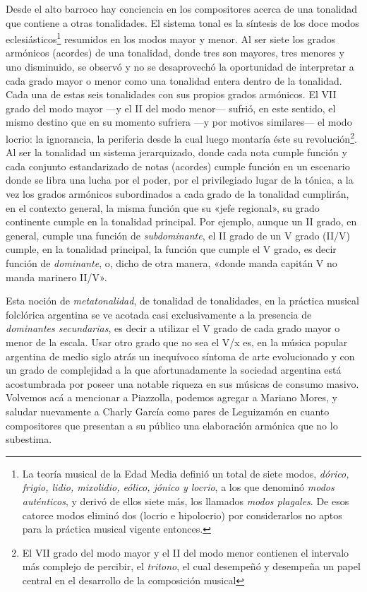 Desde el alto barroco hay conciencia en los compositores acerca de una tonalidad que contiene a otras tonalidades. El sistema tonal es la síntesis de los doce modos eclesiásticos\footnote{La teoría musical de la Edad Media definió un total de siete modos, \emph{dórico, frigio, lidio, mixolidio, eólico, jónico y locrio}, a los que denominó \emph{modos auténticos}, y derivó de ellos siete más, los llamados \emph{modos plagales}. De esos catorce modos eliminó dos (locrio e hipolocrio) por considerarlos no aptos para la práctica musical vigente entonces.} resumidos en los modos mayor y menor. Al ser siete los grados armónicos (acordes) de una tonalidad, donde tres son mayores, tres menores y uno disminuido, se observó y no se desaprovechó la oportunidad de interpretar a cada grado mayor o menor como una tonalidad entera dentro de la tonalidad. Cada una de estas seis tonalidades con sus propios grados armónicos. El VII grado del modo mayor ---y el II del modo menor--- sufrió, en este sentido, el mismo destino que en su momento sufriera ---y por motivos similares--- el modo locrio: la ignorancia, la periferia desde la cual luego montaría éste su revolución\footnote{El VII grado del modo mayor y el II del modo menor contienen el intervalo más complejo de percibir, el \emph{tritono}, el cual desempeñó y desempeña un papel central en el desarrollo de la composición musical}. Al ser la tonalidad un sistema jerarquizado, donde cada nota cumple función y cada conjunto estandarizado de notas (acordes) cumple función en un escenario donde se libra una lucha por el poder, por el privilegiado lugar de la tónica, a la vez los grados armónicos subordinados a cada grado de la tonalidad cumplirán, en el contexto general, la misma función que su «jefe regional», su grado continente cumple en la tonalidad principal. Por ejemplo, aunque un II grado, en general, cumple una función de \emph{subdominante}, el II grado de un V grado (II/V) cumple, en la tonalidad principal, la función que cumple el V grado, es decir función de \emph{dominante}, o, dicho de otra manera, «donde manda capitán V no manda marinero II/V».

Esta noción de \emph{metatonalidad}, de tonalidad de tonalidades, en la práctica musical folclórica argentina se ve acotada casi exclusivamente a la presencia de \emph{dominantes secundarias}, es decir a utilizar el V grado de cada grado mayor o menor de la escala. Usar otro grado que no sea el V/x es, en la música popular argentina de medio siglo atrás un inequívoco síntoma de arte evolucionado y con un grado de complejidad a la que afortunadamente la sociedad argentina está acostumbrada por poseer una notable riqueza en sus músicas de consumo masivo. Volvemos acá a mencionar a Piazzolla, podemos agregar a Mariano Mores, y saludar nuevamente a Charly García como pares de Leguizamón en cuanto compositores que presentan a su público una elaboración armónica que no lo subestima.

